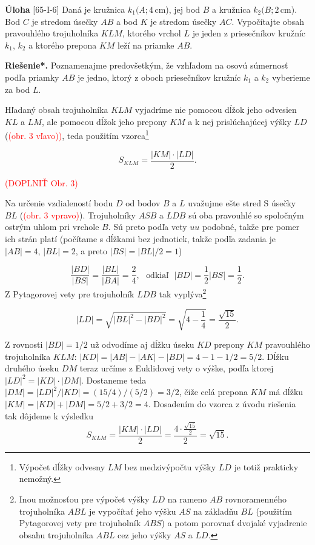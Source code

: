 \documentclass{article}
\newcommand{\rieh}{\textbf{Riešenie*.} }
\newcommand\todo[1]{\noindent\textcolor{red}{(#1)}}
\newcommand{\problem}[3]{
  \begin{tcolorbox}[breakable,notitle,boxrule=0pt,colback=light-gray,colframe=light-gray]
    \textbf{Úloha}
    [#1] #2
  \end{tcolorbox}
  \noindent#3
}
\begin{document}
\problem{65-I-6}{
Daná je kružnica $k_1 (A; 4$\,cm), jej bod $B$ a kružnica $k_2 (B; 2$\,cm). Bod $C$ je stredom úsečky $AB$ a bod $K$ je stredom úsečky $AC$. Vypočítajte obsah pravouhlého trojuholníka $KLM$, ktorého vrchol $L$ je jeden z priesečníkov kružníc $k_1$, $k_2$ a ktorého prepona $KM$ leží na priamke $AB$.
}{


\rieh Poznamenajme predovšetkým, že vzhľadom na osovú súmernosť podľa priamky $AB$ je jedno, ktorý z oboch priesečníkov kružníc $k_1$ a $k_2$ vyberieme za bod $L$.

Hľadaný obsah trojuholníka $KLM$ vyjadríme nie pomocou dĺžok jeho odvesien $KL$ a $LM$, ale pomocou dĺžok jeho prepony $KM$ a k nej prislúchajúcej výšky $LD$ (\todo{obr. 3 vľavo)}, teda použitím vzorca\footnote{Výpočet dĺžky odvesny $LM$ bez medzivýpočtu výšky $LD$ je totiž prakticky nemožný.}


$$S_{KLM} = \frac{|KM| \cdot |LD|}{2}.$$

\todo{DOPLNIŤ Obr. 3}


Na určenie vzdialeností bodu $D$ od bodov $B$ a $L$ uvažujme ešte stred S úsečky $BL$ (\todo{obr. 3 vpravo}). Trojuholníky $ASB$ a $LDB$ sú oba pravouhlé so spoločným ostrým uhlom pri vrchole $B$. Sú preto podľa vety $uu$ podobné, takže pre pomer ich strán platí (počítame s dĺžkami bez jednotiek, takže podľa zadania je $|AB| = 4$, $|BL| = 2$, a preto $|BS| = |BL|/2 = 1$)

$$\frac{|BD|}{|BS|}=\frac{|BL|}{|BA|}=\frac{2}{4}, \ \ \ \text{odkiaľ} \ \ \ |BD| =\frac{1}{2}|BS| =\frac{1}{2}.$$
Z Pytagorovej vety pre trojuholník $LDB$ tak vyplýva\footnote{Inou možnosťou pre výpočet výšky $LD$ na rameno $AB$ rovnoramenného trojuholníka $ABL$ je vypočítať jeho výšku $AS$ na základňu $BL$ (použitím Pytagorovej vety pre trojuholník $ABS$) a potom porovnať dvojaké vyjadrenie obsahu trojuholníka $ABL$ cez jeho výšky $AS$ a $LD$.}

$$|LD| =\sqrt{|BL|^2-|BD|^2}=\sqrt{4-\frac{1}{4}}=\frac{\sqrt{15}}{2}.$$

Z rovnosti $|BD| = 1/2$ už odvodíme aj dĺžku úseku $KD$ prepony $KM$ pravouhlého trojuholníka $KLM$: $|KD| = |AB| - |AK| - |BD| = 4 - 1 - 1/2 = 5/2$. Dĺžku druhého úseku $DM$ teraz určíme z Euklidovej vety o výške, podľa ktorej $|LD|^2 = |KD| \cdot |DM|$. Dostaneme teda $|DM| = |LD|^2 /|KD| = (15/4)/(5/2) = 3/2$, čiže celá prepona $KM$ má dĺžku $|KM| = |KD| + |DM| = 5/2 + 3/2 = 4$. Dosadením do vzorca z úvodu riešenia tak dôjdeme k výsledku
$$S_{KLM} = \frac{|KM| \cdot |LD|}{2}=\frac{4 \cdot \frac{\sqrt{15}}{2}}{2}=\sqrt{15}.$$


}
\end{document}

